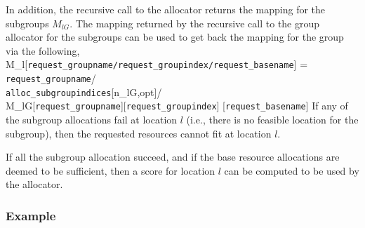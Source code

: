 \documentclass[12pt,onecolumn]{IEEEtran}
\newcommand{\bus}{\_\allowbreak}
\begin{document}
In addition, the recursive call to the allocator
returns the mapping for the subgroups $M_{lG}$.
The mapping returned by the recursive call to the group allocator for 
the subgroups can be used to get back the mapping for the group 
via the following,
\bea
M_l[\texttt{request{\bus}groupname/request{\bus}groupindex/request{\bus}basename}] 
  = \nn \\
\hspace{.2in}
 \texttt{request{\bus}groupname}/ \nn \\
  \texttt{alloc{\bus}subgroupindices}[n_{lG,opt}]/ \nn \\
 M_{lG}[\texttt{request{\bus}groupname}][\texttt{request{\bus}groupindex}]
    [\texttt{request{\bus}basename}]
\label{eqn:mapp}
\eea
If any of the subgroup allocations fail at location $l$ (i.e., there
is no feasible location for the subgroup), then the 
requested resources cannot fit at location $l$.

If all the subgroup allocation succeed, and if the base resource
allocations are deemed to be sufficient, then a score for location $l$
can be computed to be used by the allocator.

\subsubsection{Example}
\end{document}
